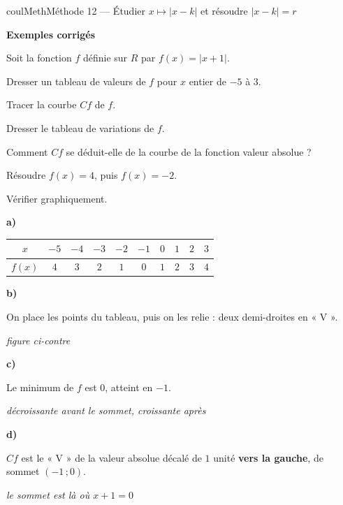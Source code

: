 \documentclass[11pt,a4paper]{article}
\makeatletter
\newcommand{\R}{\mathbb{R}}
\newcommand{\N}{\mathbb{N}}
\newcommand{\Z}{\mathbb{Z}}
\newcommand{\Q}{\mathbb{Q}}
\newcommand{\vect}[1]{\overrightarrow{#1}}
\newcommand{\fois}[1]{\times{\color{coulExo}#1}}
\providecommand{\Cf}{\mathcal{C}\sb{f}}%
\providecommand{\Cg}{\mathcal{C}\sb{g}}%
\newcounter{lycee@signet}
\newcommand{\signet}[3][]{\stepcounter{lycee@signet}%
  \edef\lycee@dest{\if\relax\detokenize{#1}\relax
    signet.\arabic{lycee@signet}\else#1\fi}%
  \hypertarget{\lycee@dest}{}\bookmark[level=#2,dest=\lycee@dest]{#3}}
\def\R{R}\def\N{N}\def\Z{Z}\def\Q{Q}\def\vect#1{#1}\def\Cf{Cf}\def\Cg{Cg}\def\fois#1{×#1}%
\newcommand{\res}[1]{#1}
\newcounter{methode}
\newenvironment{methodebox}[1][Méthode]{\stepcounter{methode}%
  \begin{boitecours}[phantom={\signet[methode-\arabic{methode}]{2}{#1}}]{coulMeth}{#1}}%
  {\end{boitecours}}
\newcommand{\etape}[1]{\par\smallskip\textbf{\color{coulMeth}#1}\par\nobreak\smallskip}
\newcommand{\explique}[2]{\par\smallskip\noindent
  \begin{minipage}[t]{0.57\linewidth}\raggedright #1\end{minipage}\hfill
  \begin{minipage}[t]{0.40\linewidth}\raggedright\leavevmode
    {\small\itshape\color{black!60}#2}\end{minipage}\par}
\newcommand{\cas}[1]{\par\smallskip\noindent\textbf{\color{coulExo}#1}\vadjust{\nobreak}}
\newenvironment{correction}{\par}{\par}
\newcommand{\etapeexemples}{\etape{Exemples corrigés}}
\makeatother
\begin{document}
\begin{methodebox}[Méthode 12 --- Étudier $x\mapsto|x-k|$ et résoudre $|x-k|=r$]
\etapeexemples
Soit la fonction $f$ définie sur $\R$ par $f(x)=|x+1|$.
\begin{questions}[label=\alph*)]
  \item Dresser un tableau de valeurs de $f$ pour $x$ entier de $-5$ à $3$.
  \item Tracer la courbe $\Cf$ de $f$.
  \item Dresser le tableau de variations de $f$.
  \item Comment $\Cf$ se déduit-elle de la courbe de la fonction valeur absolue ?
  \item Résoudre $f(x)=4$, puis $f(x)=-2$.
  \item Vérifier graphiquement.
\end{questions}
\begin{correction}
\cas{a)}\par\nopagebreak
\begin{center}
\renewcommand{\arraystretch}{1.3}
\begin{tabular}{|c|*{9}{c|}}
\hline
$x$ & $-5$ & $-4$ & $-3$ & $-2$ & $-1$ & $0$ & $1$ & $2$ & $3$\\
\hline
$f(x)$ & $4$ & $3$ & $2$ & $1$ & $0$ & $1$ & $2$ & $3$ & $4$\\
\hline
\end{tabular}
\end{center}
\begin{minipage}[t]{0.58\linewidth}\raggedright
\vspace{0pt}
\cas{b)}
\explique{On place les points du tableau, puis on les relie : deux demi-droites en
« V ».}{figure ci-contre}
\cas{c)}\par\nopagebreak
\begin{center}
\end{center}
\explique{Le minimum de $f$ est $0$, atteint en $-1$.}{décroissante avant le sommet,
croissante après}
\cas{d)}
\explique{$\Cf$ est le « V » de la valeur absolue \res{décalé de $1$ unité
\textbf{vers la gauche}}, de sommet $(-1\,;0)$.}{le sommet est là où $x+1=0$}
\end{minipage}\hfill
\begin{minipage}[t]{0.38\linewidth}\centering
\vspace{0pt}

\end{minipage}
\end{correction}
\end{methodebox}
\end{document}

